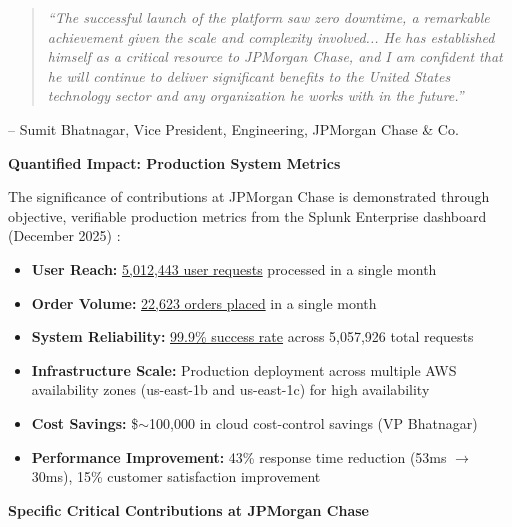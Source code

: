 \begin{quote}
\textit{``The successful launch of the platform saw zero downtime, a remarkable achievement given the scale and complexity involved... He has established himself as a critical resource to JPMorgan Chase, and I am confident that he will continue to deliver significant benefits to the United States technology sector and any organization he works with in the future.''}
\end{quote}

\hfill -- Sumit Bhatnagar, Vice President, Engineering, JPMorgan Chase \& Co.

\vspace{1em}

\textbf{Quantified Impact: Production System Metrics}

The significance of \drs contributions at JPMorgan Chase is demonstrated through objective, verifiable production metrics from the Splunk Enterprise dashboard (December 2025) \cite{CR3}:

\begin{itemize}
    \item \textbf{User Reach:} \underline{5,012,443 user requests} processed in a single month
    \item \textbf{Order Volume:} \underline{22,623 orders placed} in a single month
    \item \textbf{System Reliability:} \underline{99.9\% success rate} across 5,057,926 total requests
    \item \textbf{Infrastructure Scale:} Production deployment across multiple AWS availability zones (us-east-1b and us-east-1c) for high availability
    \item \textbf{Cost Savings:} \$${\sim}$100,000 in cloud cost-control savings (VP Bhatnagar)
    \item \textbf{Performance Improvement:} 43\% response time reduction (53ms $\rightarrow$ 30ms), 15\% customer satisfaction improvement
\end{itemize}

\textbf{Specific Critical Contributions at JPMorgan Chase}

